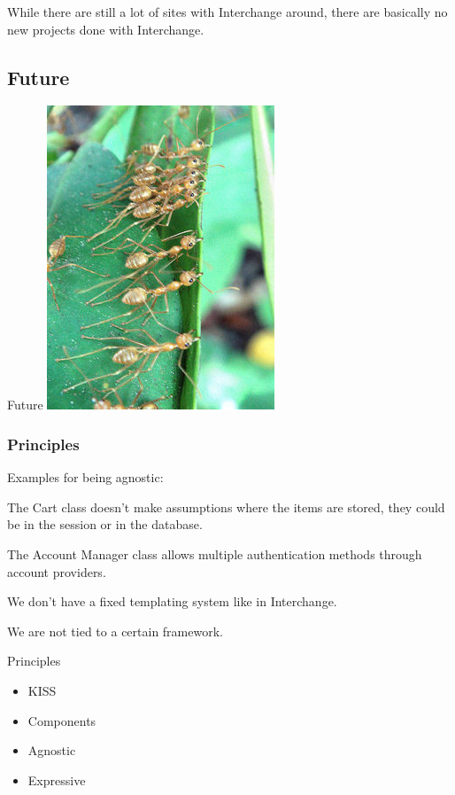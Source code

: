 While there are still a lot of sites with Interchange around,
there are basically no new projects done with Interchange.

\subsection{Future}
\begin{frame}{Future}
  \includegraphics{ants.jpg}
\end{frame}

\subsubsection{Principles}
Examples for being agnostic:

The Cart class doesn't make assumptions where the items are
stored, they could be in the session or in the database.

The Account Manager class allows multiple authentication
methods through account providers.

We don't have a fixed templating system like in Interchange.

We are not tied to a certain framework.

\begin{frame}{Principles}
\begin{itemize}
\item KISS
\item Components
\item Agnostic
\item Expressive
\end{itemize}
\end{frame}

